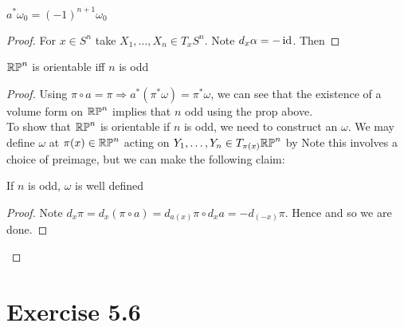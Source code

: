 \documentclass{article}
\begin{document}
\begin{prop}
$a^\ast \omega_0 = (-1)^{n+1} \omega_0$
\end{prop}
\begin{proof}
For $x \in S^n$ take $X_1, \dots, X_n \in T_xS^n$. Note $d_x \alpha = -\operatorname{id}$. Then 
\end{proof}
\begin{corollary}
$\mathbb{RP}^n$ is orientable iff $n$ is odd
\end{corollary}
\begin{proof}
Using $\pi \circ a = \pi \Rightarrow a^\ast(\pi^\ast \omega) = \pi^\ast \omega$, we can see that the existence of a volume form on $\mathbb{RP}^n$ implies that $n$ odd using the prop above. \\
To show that $\mathbb{RP}^n$ is orientable if $n$ is odd, we need to construct an $\omega$. We may define $\omega$ at $\pi(x) \in \mathbb{RP}^n$ acting on $Y_1, \dots, Y_n \in T_{\pi(x)}\mathbb{RP}^n$ by 
Note this involves a choice of preimage, but we can make the following claim:

\begin{claim}
If $n$ is odd, $\omega$ is well defined
\end{claim}
\begin{proof}
Note $d_x\pi = d_x(\pi \circ a) = d_{a(x)} \pi \circ d_xa = -d_{(-x)}\pi$. Hence 
and so we are done. 
\end{proof}
\end{proof}



\section{Exercise 5.6}
\end{document}
